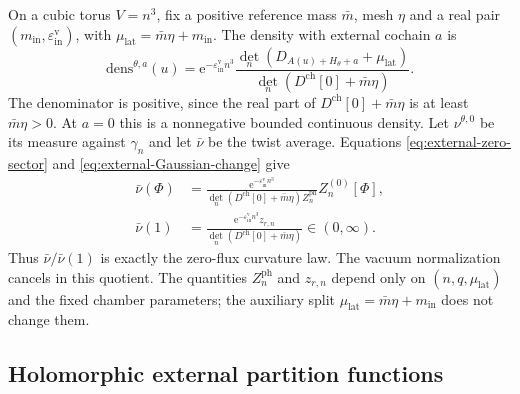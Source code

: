 On a cubic torus $V=n^3$, fix a positive reference mass
$\bar m$, mesh $\eta$ and a real pair
$(m_{\mathrm{in}},\varepsilon_{\mathrm{in}}^{\mathrm v})$,
with $\mu_{\mathrm{lat}}=\bar m\eta+m_{\mathrm{in}}$.
The density with external cochain $a$ is
\begin{equation}\label{eq:external-matter-density}
 \mathrm{dens}^{\theta,a}(u)=
 \mathrm e^{-\varepsilon_{\mathrm{in}}^{\mathrm v}n^3}
 \frac{\det_n(D_{A(u)+H_\theta+a}+\mu_{\mathrm{lat}})}
                       {\det_n(D^{\mathrm{ch}}[0]+\bar m\eta)}.
\end{equation}
The denominator is positive, since the real part
of $D^{\mathrm{ch}}[0]+\bar m\eta$ is at least $\bar m\eta>0$.
At $a=0$ this is a nonnegative bounded continuous
density. Let $\nu^{\theta,0}$ be its measure against
$\gamma_n$ and let $\bar\nu$ be the twist average.
Equations \eqref{eq:external-zero-sector} and
\eqref{eq:external-Gaussian-change} give
\begin{align}
 \bar\nu(\Phi)
   &=\frac{\mathrm e^{-\varepsilon_{\mathrm{in}}^{\mathrm v}n^3}}
        {\det_n(D^{\mathrm{ch}}[0]+\bar m\eta)Z_n^{\mathrm{ph}}}
                                      Z_n^{(0)}[\Phi],
                                  \label{eq:external-density-zero-sector}\\
 \bar\nu(1)
   &=\frac{\mathrm e^{-\varepsilon_{\mathrm{in}}^{\mathrm v}n^3}
                                   z_{r,n}}
                       {\det_n(D^{\mathrm{ch}}[0]+\bar m\eta)}
                                  \in(0,\infty).
                                  \label{eq:external-density-normalization}
\end{align}
Thus $\bar\nu/\bar\nu(1)$ is exactly the zero-flux
curvature law. The vacuum normalization cancels in
this quotient. The quantities $Z_n^{\mathrm{ph}}$
and $z_{r,n}$ depend only on $(n,q,\mu_{\mathrm{lat}})$
and the fixed chamber parameters; the auxiliary
split $\mu_{\mathrm{lat}}=\bar m\eta+m_{\mathrm{in}}$
does not change them.

\subsection{Holomorphic external partition functions}
\label{subsec:external-holomorphy}

